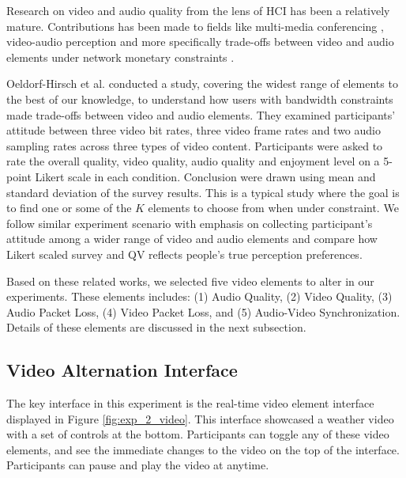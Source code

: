 Research on video and audio quality 
from the lens of HCI 
has been a relatively mature.
Contributions has been made to fields like
multi-media conferencing \cite{watson1996evaluating}, 
video-audio perception \cite{chen2006cognitive, molnar2015assessing}
and more specifically trade-offs 
between video and audio elements 
under network monetary constraints \cite{molnar2013comedy, oeldorf2012bad}.

Oeldorf-Hirsch et al. \cite{oeldorf2012bad} conducted a study, 
covering the widest range of elements 
to the best of our knowledge,
to understand how users 
with bandwidth constraints 
made trade-offs between video and audio elements. 
They examined participants' attitude 
between three video bit rates, 
three video frame rates 
and two audio sampling rates 
across three types of video content.
Participants were asked to rate the overall quality, 
video quality, audio quality and enjoyment level 
on a 5-point Likert scale in each condition. 
Conclusion were drawn 
using mean and standard deviation 
of the survey results.
This is a typical study 
where the goal is to find  
one or some of the $K$ elements to choose from
when under constraint.
We follow similar experiment scenario
with emphasis on collecting participant's attitude
among a wider range of video and audio elements 
and compare how Likert scaled survey 
and QV reflects people's true perception preferences. 

Based on these related works, 
we selected five video elements to alter
in our experiments. 
These elements includes: 
(1) Audio Quality, 
(2) Video Quality,
(3) Audio Packet Loss,
(4) Video Packet Loss, and 
(5) Audio-Video Synchronization.
Details of these elements 
are discussed in the next subsection.


\subsection{Video Alternation Interface}
The key interface in this experiment
is the real-time video element interface
displayed in Figure \ref{fig:exp_2_video}. 
This interface showcased a weather video
with a set of controls at the bottom.
Participants can toggle any of these video elements,
and see the immediate changes to the video
on the top of the interface.
Participants can pause and play the video at anytime.

